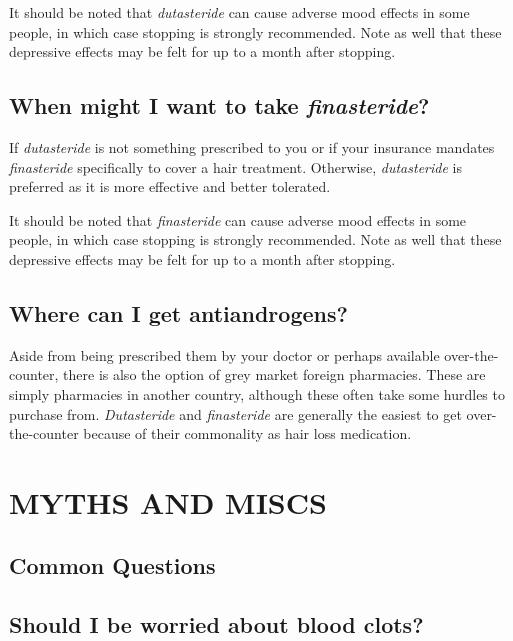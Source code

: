 \documentclass{article}
\begin{document}
It should be noted that \textit{dutasteride} can cause adverse mood effects in some people, in which case stopping is strongly recommended. Note as well that these depressive effects may be felt for up to a month after stopping.

\subsection{When might I want to take \textit{finasteride}?}

If \textit{dutasteride} is not something prescribed to you or if your insurance mandates \textit{finasteride} specifically to cover a hair treatment. Otherwise, \textit{dutasteride} is preferred as it is more effective and better tolerated.

It should be noted that \textit{finasteride} can cause adverse mood effects in some people, in which case stopping is strongly recommended. Note as well that these depressive effects may be felt for up to a month after stopping.

\subsection{Where can I get antiandrogens?}

Aside from being prescribed them by your doctor or perhaps available over-the-counter, there is also the option of grey market foreign pharmacies. These are simply pharmacies in another country, although these often take some hurdles to purchase from. \textit{Dutasteride} and \textit{finasteride} are generally the easiest to get over-the-counter because of their commonality as hair loss medication.



\section{MYTHS AND MISCS}\label{MM}

\subsection*{Common Questions}

\subsection{Should I be worried about blood clots?}\label{11-1}
\end{document}
